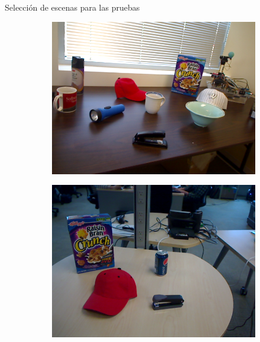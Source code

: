 \documentclass[]{beamer}
\begin{document}
\begin{frame}{Selección de escenas para las pruebas}
\begin{figure}
        \begin{subfigure}{0.45\textwidth}
            \centering
            \includegraphics[scale=0.2]{img/escenas/table_1.png}
        \end{subfigure}
        \begin{subfigure}{0.45\textwidth}
            \centering
            \includegraphics[scale=0.2]{img/escenas/table_small_2.png}
        \end{subfigure}
    \end{figure}
\end{frame}

\end{document}
